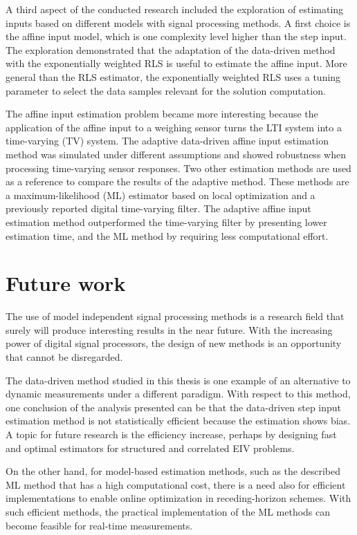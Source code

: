 A third aspect of the conducted research included the exploration of estimating inputs based on different models with signal processing methods. 
A first choice is the affine input model, which is one complexity level higher than the step input.
The exploration demonstrated that the adaptation of the data-driven method with the exponentially weighted RLS is useful to estimate the affine input.
More general than the RLS estimator, the exponentially weighted RLS uses a tuning parameter to select the data samples relevant for the solution computation.

The affine input estimation problem became more interesting because the application of the affine input to a weighing sensor turns the LTI system into a time-varying (TV) system. 
The adaptive data-driven affine input estimation method was simulated under different assumptions and showed robustness when processing time-varying sensor responses.
Two other estimation methods are used as a reference to compare the results of the adaptive method.
These methods are a maximum-likelihood (ML) estimator based on local optimization and a previously reported digital time-varying filter.
The adaptive affine input estimation method outperformed the time-varying filter by presenting lower estimation time, and the ML method by requiring less computational effort.  


\section*{Future work}

The use of model independent signal processing methods is a research field that surely will produce interesting results in the near future. 
With the increasing power of digital signal processors, the design of new methods is an opportunity that cannot be disregarded.

The data-driven method studied in this thesis is one example of an alternative to dynamic measurements under a different paradigm.
With respect to this method, one conclusion of the analysis presented can be that the data-driven step input estimation method is not statistically efficient because the estimation shows bias.
A topic for future research is the efficiency increase, perhaps by designing fast and optimal estimators for structured and correlated EIV problems. 

On the other hand, for model-based estimation methods, such as the described ML method that has a high computational cost, there is a need also for efficient implementations to enable online optimization in receding-horizon schemes. 
With such efficient methods, the practical implementation of the ML methods can become feasible for real-time measurements.


